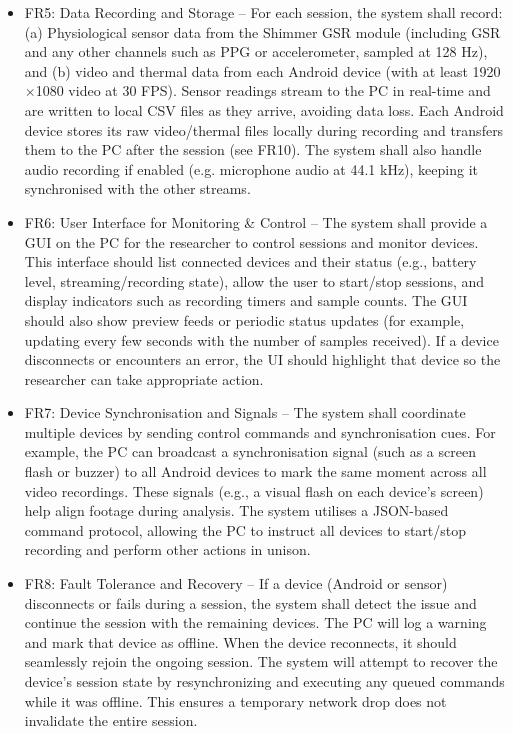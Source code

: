 \begin{itemize}
    \item FR5: Data Recording and Storage -- For each session, the system shall record: (a) Physiological sensor data from the Shimmer GSR module (including GSR and any other channels such as PPG or accelerometer, sampled at 128 Hz), and (b) video and thermal data from each Android device (with at least 1920$\times$1080 video at 30 FPS). Sensor readings stream to the PC in real-time and are written to local CSV files as they arrive, avoiding data loss. Each Android device stores its raw video/thermal files locally during recording and transfers them to the PC after the session (see FR10). The system shall also handle audio recording if enabled (e.g. microphone audio at 44.1 kHz), keeping it synchronised with the other streams.

    \item FR6: User Interface for Monitoring \& Control -- The system shall provide a GUI on the PC for the researcher to control sessions and monitor devices. This interface should list connected devices and their status (e.g., battery level, streaming/recording state), allow the user to start/stop sessions, and display indicators such as recording timers and sample counts. The GUI should also show preview feeds or periodic status updates (for example, updating every few seconds with the number of samples received). If a device disconnects or encounters an error, the UI should highlight that device so the researcher can take appropriate action.

    \item FR7: Device Synchronisation and Signals -- The system shall coordinate multiple devices by sending control commands and synchronisation cues. For example, the PC can broadcast a synchronisation signal (such as a screen flash or buzzer) to all Android devices to mark the same moment across all video recordings. These signals (e.g., a visual flash on each device's screen) help align footage during analysis. The system utilises a JSON-based command protocol, allowing the PC to instruct all devices to start/stop recording and perform other actions in unison.

    \item FR8: Fault Tolerance and Recovery -- If a device (Android or sensor) disconnects or fails during a session, the system shall detect the issue and continue the session with the remaining devices. The PC will log a warning and mark that device as offline. When the device reconnects, it should seamlessly rejoin the ongoing session. The system will attempt to recover the device's session state by resynchronizing and executing any queued commands while it was offline. This ensures a temporary network drop does not invalidate the entire session.


\end{itemize}
